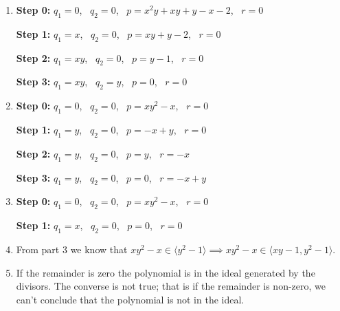 \documentclass[Notebook.tex]{subfiles}
\begin{document}
\begin{solution}
    \bbni
    \begin{enumerate}
        \item \textbf{Step 0:}  $q_1 = 0$, \, $q_2 = 0$, \, $p = x^2y + xy + y - x - 2$, \, $r = 0$
        
        \textbf{Step 1:} 
        $q_1 = x $, \, $q_2 = 0$, \, $p = xy + y - 2$, \, $r = 0$

        \textbf{Step 2:} 
        $q_1 = xy$, \, $q_2 = 0$, \, $p = y - 1 $, \, $r = 0$

        \textbf{Step 3:} 
        $q_1 = xy$, \, $q_2 = y$, \, $p = 0$, \, $r = 0$

        \item  \textbf{Step 0:}  $q_1 = 0$, \, $q_2 = 0$, \, $p = xy^2 - x$, \, $r = 0$
        
        \textbf{Step 1:} 
        $q_1 = y $, \, $q_2 = 0$, \, $p = -x + y$, \, $r = 0$

        \textbf{Step 2:} 
        $q_1 = y $, \, $q_2 = 0$, \, $p = y$, \, $r = -x$

        \textbf{Step 3:} 
        $q_1 = y $, \, $q_2 = 0$, \, $p = 0$, \, $r = -x + y$


        \item  \textbf{Step 0:}  $q_1 = 0$, \, $q_2 = 0$, \, $p = xy^2 - x$, \, $r = 0$
        
        \textbf{Step 1:} 
        $q_1 = x $, \, $q_2 = 0$, \, $p =0$, \, $r = 0$

        \item From part 3 we know that $xy^2 - x \in \langle y^2 - 1 \rangle \implies xy^2 - x \in \langle xy - 1, y^2 - 1 \rangle$. 
        
        \item If the remainder is zero the polynomial is in the ideal generated by the divisors. The converse is not true; that is if the remainder is non-zero, we can't conclude that the polynomial is not in the ideal.  
    \end{enumerate}
\end{solution}

\newpage 
\end{document}

